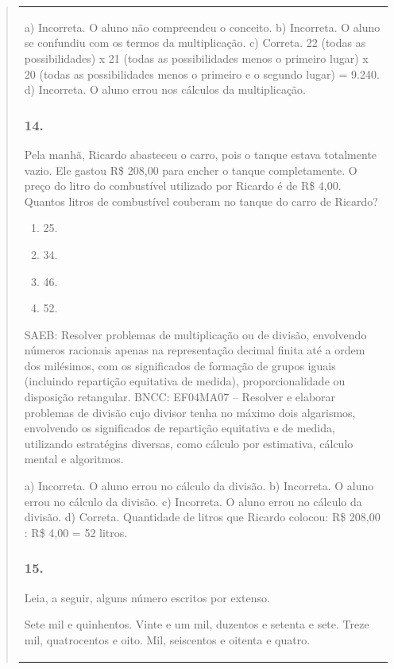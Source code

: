 \begin{mdframed}[linewidth=2pt,linecolor=salmao,roundcorner=2pt]
\begin{itemize}
{\begin{itemize}
\begin{escolha}
{\begin{quote}
{\begin{escolha}
{{{{{\begin{longtable}[]{@{}l@{}}
\begin{itemize}
{a) Incorreta. O aluno não compreendeu o conceito.
b) Incorreta. O aluno se confundiu com os termos da multiplicação.
c) Correta. 22 (todas as possibilidades) x 21 (todas as possibilidades menos o primeiro lugar) x 20 (todas as possibilidades menos o primeiro e o segundo lugar) = 9.240.
d) Incorreta. O aluno errou nos cálculos da multiplicação.

\subsubsection{14.}

Pela manhã, Ricardo abasteceu o carro, pois o tanque estava totalmente
vazio. Ele gastou R\$ 208,00 para encher o tanque completamente.
O preço do litro do combustível utilizado por Ricardo
é de R\$ 4,00. Quantos litros de combustível couberam no tanque do carro de
Ricardo?

\begin{enumerate}
\item
  25.
\item
  34.
\item
  46.
\item
  52.
\end{enumerate}

SAEB: Resolver problemas de multiplicação ou de divisão,
envolvendo números racionais apenas na representação decimal finita até
a ordem dos milésimos, com os significados de formação de grupos iguais
(incluindo repartição equitativa de medida), proporcionalidade ou
disposição retangular.
BNCC: EF04MA07 -- Resolver e elaborar problemas de divisão cujo divisor tenha no máximo dois algarismos,
envolvendo os significados de repartição equitativa e de medida, utilizando estratégias diversas,
como cálculo por estimativa, cálculo mental e algoritmos.

a) Incorreta. O aluno errou no cálculo da divisão.
b) Incorreta. O aluno errou no cálculo da divisão.
c) Incorreta. O aluno errou no cálculo da divisão.
d) Correta. Quantidade de litros que Ricardo colocou: R\$ 208,00 : R\$ 4,00 = 52
litros.

\subsubsection{15.}

Leia, a seguir, alguns número escritos por extenso.

Sete mil e quinhentos.
Vinte e um mil, duzentos e setenta e sete.
Treze mil, quatrocentos e oito.
Mil, seiscentos e oitenta e quatro.

}
\end{itemize}
\end{longtable}}}}}}
\end{escolha}}
\end{quote}}
\end{escolha}
\end{itemize}}
\end{itemize}
\end{mdframed}
